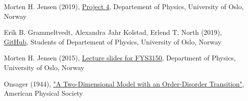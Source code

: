 \documentclass{article}
\begin{document}
\begin{thebibliography}{}

Morten H. Jensen (2019), \href{https://github.com/CompPhysics/ComputationalPhysics/blob/master/doc/Projects/2019/Project4/pdf/Project4.pdf}{Project 4}, Departement of Physics, University of Oslo, Norway

Erik B. Grammeltvedt, Alexandra Jahr Kolstad, Erlend T. North (2019), \href{https://github.com/Erikbgram/Fys3150}{GitHub}, Students of Departement of Physics, University of Oslo, Norway

Morten H. Jensen (2015), \href{https://github.com/CompPhysics/ComputationalPhysics/blob/master/doc/Lectures/lectures2015.pdf}{Lecture slides for FYS3150}, Department of Physics, University of Oslo, Norway

Onsager (1944), \href{https://journals.aps.org/pr/abstract/10.1103/PhysRev.65.117}{"A Two-Dimensional Model with an Order-Disorder Transition"}, American Physical Society


\end{thebibliography}




\end{document}
